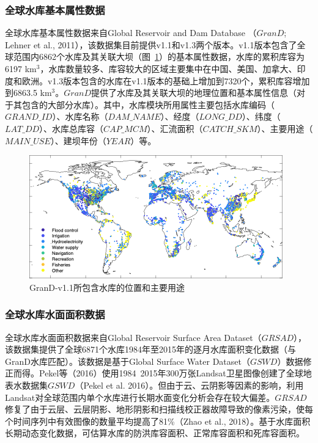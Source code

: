 \subsubsection{全球水库基本属性数据}
全球水库基本属性数据来自Global Reservoir and Dam Database （$GranD$; Lehner et al., 2011），该数据集目前提供v1.1和v1.3两个版本。v1.1版本包含了全球范围内6862个水库及其关联大坝（图~\ref{fig:GranD-v1.1所包含水库的位置和主要用途}）的基本属性数据，水库的累积库容为6197 km$^{3}$，水库数量较多、库容较大的区域主要集中在中国、美国、加拿大、印度和欧洲。v1.3版本包含的水库在v1.1版本的基础上增加到7320个，累积库容增加到6863.5 km$^{3}$。$GranD$提供了水库及其关联大坝的地理位置和基本属性信息（对于其包含的大部分水库）。其中，水库模块所用属性主要包括水库编码（$GRAND\_ID$）、水库名称（$DAM\_NAME$）、经度（$LONG\_DD$）、纬度（$LAT\_DD$）、水库总库容（$CAP\_MCM$）、汇流面积（$CATCH\_SKM$）、主要用途（$MAIN\_USE$）、建坝年份（$YEAR$）等。
{
\begin{figure}[]
\centering
\includegraphics{Figures/基础数据/GranD-v1.1所包含水库的位置和主要用途.png}
\caption{GranD-v1.1所包含水库的位置和主要用途}
\label{fig:GranD-v1.1所包含水库的位置和主要用途}
\end{figure}
}

\subsubsection{全球水库水面面积数据}
全球水库水面面积数据来自Global Reservoir Surface Area Dataset（$GRSAD$），该数据集提供了全球6871个水库1984年至2015年的逐月水库面积变化数据（与GranD水库匹配）。该数据是基于Global Surface Water Dataset（$GSWD$）数据修正而得。Pekel等（2016）使用1984~2015年300万张Landsat卫星图像创建了全球地表水数据集$GSWD$（Pekel et al. 2016）。但由于云、云阴影等因素的影响，利用Landsat对全球范围内单个水库进行长期水面变化分析会存在较大偏差。$GRSAD$修复了由于云层、云层阴影、地形阴影和扫描线校正器故障导致的像素污染，使每个时间序列中有效图像的数量平均提高了81\%（Zhao et al., 2018）。基于水库面积长期动态变化数据，可估算水库的防洪库容面积、正常库容面积和死库容面积。

